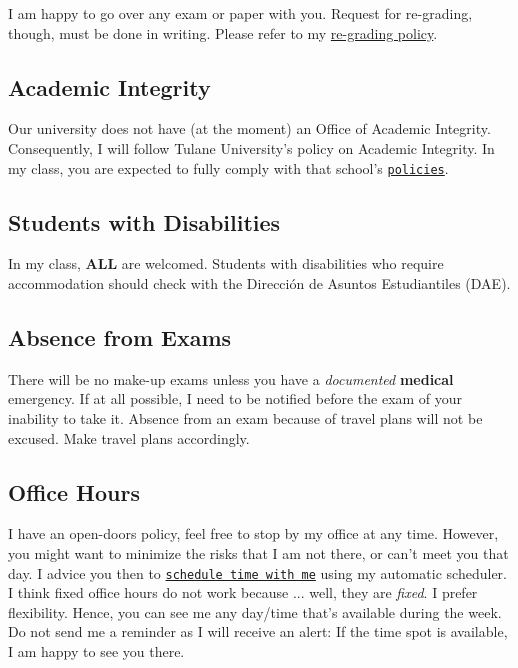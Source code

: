 \documentclass[letterpaper]{article}
\begin{document}
I am happy to go over any exam or paper with you. Request for re-grading, though, must be done in writing. Please refer to my \href{https://github.com/hbahamonde/hbahamonde.github.io/raw/master/resources/ReGrade_Policy.pdf}{re-grading policy}.


\subsection*{Academic Integrity}
Our university does not have (at the moment) an Office of Academic Integrity. Consequently, I will follow Tulane University's policy on Academic Integrity. In my class, you are expected to fully comply with that school's \href{https://college.tulane.edu/code-of-academic-conduct}{\texttt{policies}}. 


\subsection*{Students with Disabilities}
In my class, {\bf ALL} are welcomed. Students with disabilities who require accommodation should check with the {\color{blue}Direcci\'on de Asuntos Estudiantiles (DAE)}.


\subsection*{Absence from Exams}


There will be no make-up exams unless you have a \emph{documented} {\bf medical} emergency. If at all possible, I need to be notified before the exam of your inability to take it. Absence from an exam because of travel plans will not be excused. Make travel plans accordingly. 


\subsection*{Office Hours}

I have an open-doors policy, feel free to stop by my office at any time. However, you might want to minimize the risks that I am not there, or can't meet you that day. I advice you then to \href{https://calendly.com/bahamonde/officehours}{\texttt{schedule time with me}} using my automatic scheduler. I think fixed office hours do not work because ... well, they are \emph{fixed}. I prefer flexibility. Hence, you can see me any day/time that's available during the week. Do not send me a reminder as I will receive an alert: If the time spot is available, I am happy to see you there.
\end{document}
